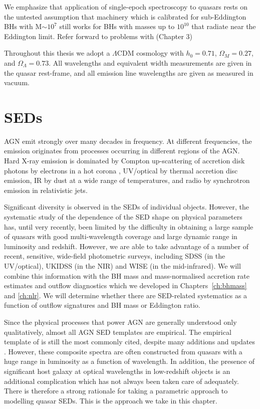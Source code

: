 We emphasize that application of single-epoch spectroscopy to quasars rests on the untested assumption that machinery which is calibrated for sub-Eddington BHs with M$\sim10^7$ still works for BHs with masses up to $10^{10}$ that radiate near the Eddington limit. 
Refer forward to problems with  (Chapter 3)


Throughout this thesis we adopt a $\Lambda$CDM cosmology with $h_0=0.71$, $\Omega_M=0.27$, and $\Omega_\Lambda=0.73$. 
All wavelengths and equivalent width measurements are given in the quasar rest-frame, and all emission line wavelengths are given as measured in vacuum.



 
\section{SEDs}

\ac{AGN} emit strongly over many decades in frequency. 
At different frequencies, the emission originates from processes occurring in different regions of the \ac{AGN}. 
Hard X-ray emission is dominated by Compton up-scattering of accretion disk photons by electrons in a hot corona \citep[e.g.][]{sunyaev80}, \ac{UV}/optical by thermal accretion disc emission, \ac{IR} by dust at a wide range of temperatures, and radio by synchrotron emission in relativistic jets.   

Significant diversity is observed in the \ac{SED}s of individual objects. 
However, the systematic study of the dependence of the \ac{SED} shape on physical parameters has, until very recently, been limited by the difficulty in obtaining a large sample of quasars with good multi-wavelength coverage and large dynamic range in luminosity and redshift. 
However, we are able to take advantage of a number of recent, sensitive, wide-field photometric surveys, including SDSS (in the UV/optical), UKIDSS (in the \ac{NIR}) and WISE (in the mid-infrared).
We will combine this information with the \ac{BH} mass and mass-normalised accretion rate estimates and outflow diagnostics which we developed in Chapters~\ref{ch:bhmass} and \ref{ch:nlr}. 
We will determine whether there are \ac{SED}-related systematics as a function of outflow signatures and \ac{BH} mass or Eddington ratio. 

Since the physical processes that power \ac{AGN} are generally understood only qualitatively, almost all \ac{AGN} \ac{SED} templates are empirical. 
The empirical template of \citet{elvis94} is still the most commonly cited, despite many additions and updates \citep[e.g.][]{polletta00, kuraszkiewicz03, risaliti04, richards06,  polletta07, lusso10, shang11, marchese12, trichas12}. 
However, these composite spectra are often constructed from quasars with a huge range in luminosity as a function of wavelength. 
In addition, the presence of significant host galaxy at optical wavelengths in low-redshift objects is an additional complication which has not always been taken care of adequately. 
There is therefore a strong rationale for taking a parametric approach to modelling quasar \ac{SED}s. 
This is the approach we take in this chapter. 



